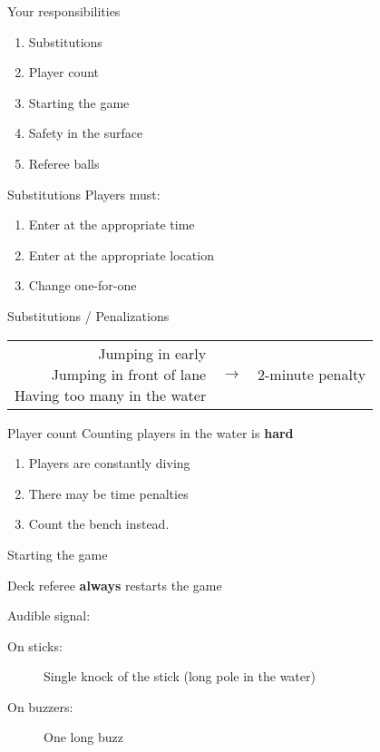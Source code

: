 \begin{frame}{Your responsibilities}
    \begin{enumerate}
        \item Substitutions
        \item Player count
        \item Starting the game
        \item Safety in the surface
        \item Referee balls
    \end{enumerate}
\end{frame}

\begin{frame}{Substitutions}
    Players must:
    \begin{enumerate}
        \item Enter at the appropriate time
        \item Enter at the appropriate location
        \item Change one-for-one
    \end{enumerate}
\end{frame}

\begin{frame}{Substitutions / Penalizations}
    \begin{tabular}{rcl}
        \parbox{0.45\textwidth} { Jumping in early                 \\ Jumping in front of lane \\ Having
        too many in the water } & $\rightarrow$ & 2-minute penalty
    \end{tabular}
\end{frame}

\begin{frame}{Player count}
    Counting players in the water is \textbf{hard}
    \begin{enumerate}
        \item Players are constantly diving
        \item There may be time penalties

              \pause{}

        \item Count the bench instead.
    \end{enumerate}
\end{frame}

\begin{frame}{Starting the game}
    \begin{center}
        Deck referee \textbf{always} restarts the game \pause{}
    \end{center}

    Audible signal:

    \begin{description}
        \item[On sticks:] Single knock of the stick (long pole in the water)
        \item[On buzzers:] One long buzz
    \end{description}
\end{frame}

